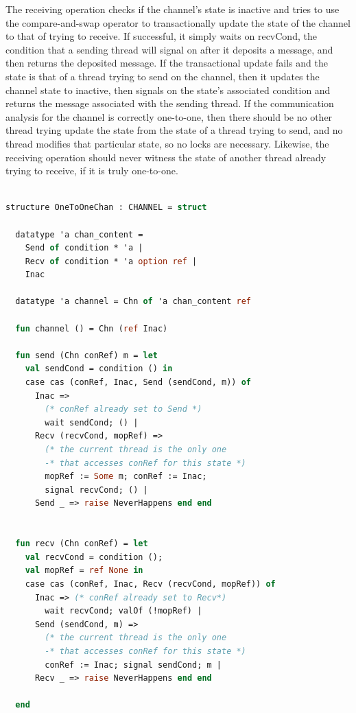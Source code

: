 \documentclass{article}
\begin{document}
The receiving operation checks if the channel's state is inactive and tries to use the
compare-and-swap operator to transactionally update the state of the channel to that of trying
to receive.  If successful, it simply waits on recvCond, the condition that a sending thread
will signal on after it deposits a message, and then returns the deposited message.  If the
transactional update fails and the state is that of a thread trying to send on the channel,
then it updates the channel state to inactive, then signals on the state's associated
condition and returns the message associated with the sending thread.  If the communication
analysis for the channel is correctly one-to-one, then there should be no other thread trying
update the state from the state of a thread trying to send, and no thread modifies that
particular state, so no locks are necessary.  Likewise, the receiving operation should never
witness the state of another thread already trying to receive, if it is truly one-to-one.

\begin{lstlisting}[language=ML, escapechar=\%]

structure OneToOneChan : CHANNEL = struct

  datatype 'a chan_content =
    Send of condition * 'a |
    Recv of condition * 'a option ref |
    Inac  

  datatype 'a channel = Chn of 'a chan_content ref

  fun channel () = Chn (ref Inac)

  fun send (Chn conRef) m = let
    val sendCond = condition () in
    case cas (conRef, Inac, Send (sendCond, m)) of
      Inac => 
        (* conRef already set to Send *)
        wait sendCond; () |
      Recv (recvCond, mopRef) =>
        (* the current thread is the only one
        -* that accesses conRef for this state *)
        mopRef := Some m; conRef := Inac;
        signal recvCond; () |
      Send _ => raise NeverHappens end end


  fun recv (Chn conRef) = let
    val recvCond = condition ();
    val mopRef = ref None in
    case cas (conRef, Inac, Recv (recvCond, mopRef)) of
      Inac => (* conRef already set to Recv*)
        wait recvCond; valOf (!mopRef) |
      Send (sendCond, m) =>
        (* the current thread is the only one
        -* that accesses conRef for this state *)
        conRef := Inac; signal sendCond; m |
      Recv _ => raise NeverHappens end end 

  end
  \end{lstlisting}
\end{document}
